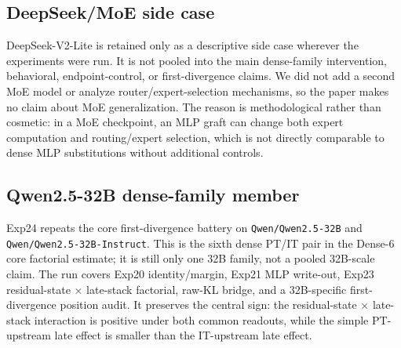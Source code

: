 \documentclass[11pt]{article}
\begin{document}
\subsection{DeepSeek/MoE side case}

DeepSeek-V2-Lite is retained only as a descriptive side case wherever the experiments were run. It is not pooled into the main dense-family intervention, behavioral, endpoint-control, or first-divergence claims. We did not add a second MoE model or analyze router/expert-selection mechanisms, so the paper makes no claim about MoE generalization. The reason is methodological rather than cosmetic: in a MoE checkpoint, an MLP graft can change both expert computation and routing/expert selection, which is not directly comparable to dense MLP substitutions without additional controls.

\subsection{Qwen2.5-32B dense-family member}

Exp24 repeats the core first-divergence battery on \texttt{Qwen/Qwen2.5-32B} and \texttt{Qwen/Qwen2.5-32B-Instruct}. This is the sixth dense PT/IT pair in the Dense-6 core factorial estimate; it is still only one 32B family, not a pooled 32B-scale claim. The run covers Exp20 identity/margin, Exp21 MLP write-out, Exp23 residual-state \ensuremath{\times} late-stack factorial, raw-KL bridge, and a 32B-specific first-divergence position audit. It preserves the central sign: the residual-state \ensuremath{\times} late-stack interaction is positive under both common readouts, while the simple PT-upstream late effect is smaller than the IT-upstream late effect.
\end{document}
